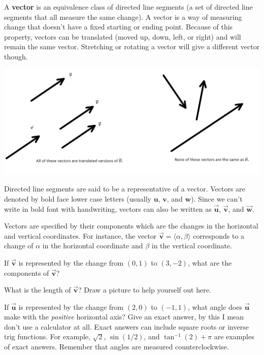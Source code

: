 \begin{info} A \textbf{vector} is an equivalence class of directed line segments (a set of directed line segments that all  measure the same change). A vector is a way of measuring change that doesn't have a fixed starting or ending point. Because of this property, vectors can be translated (moved up, down, left, or right) and will remain the same vector. Stretching or rotating a vector will give a different vector though.

\includegraphics[scale=.5]{transvect.png}

Directed line segments are said to be a representative of a vector. Vectors are denoted by bold face lower case letters (usually $\textbf{u}$, $\textbf{v}$, and $\textbf{w}$). Since we can't write in bold font with handwriting, vectors can also be written as $\vec{\textbf{u}}$, $\vec{\textbf{v}}$, and $\vec{\textbf{w}}$.

Vectors are specified by their components which are the changes in the horizontal and vertical coordinates. For instance, the vector $\vec{\textbf{v}}= \langle \alpha,\beta \rangle $ corresponds to a change of $\alpha$ in the horizontal coordinate and $\beta$ in the vertical coordinate.

\end{info}

\bq \be
\item If $\vec{\textbf{v}}$ is represented by the change from $(0,1)$ to $(3,-2)$, what are the components of $\vec{\textbf{v}}$?
\item What is the length of $\vec{\textbf{v}}$? Draw a picture to help yourself out here.
\ee
\eq

\bq If $\vec{\textbf{u}}$ is represented by the change from $(2,0)$ to $(-1,1)$, what angle does $\vec{\textbf{u}}$ make with the \emph{positive} horizontal axis? Give an exact answer, by this I mean don't use a calculator at all. Exact answers can include square roots or inverse trig functions. For example, $\sqrt{2}$, $\sin(1/2)$, and $\tan^{-1}(2)+\pi$ are examples of exact answers. Remember that angles are measured counterclockwise.
\eq

